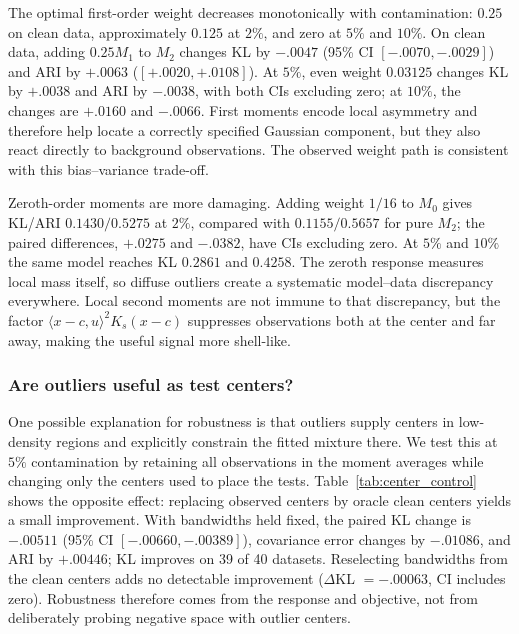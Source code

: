 \documentclass[11pt,a4paper]{article}
\newcommand{\Mzero}{M_0}
\newcommand{\Mone}{M_1}
\newcommand{\Mtwo}{M_2}
\begin{document}
The optimal first-order weight decreases monotonically with contamination:
$0.25$ on clean data, approximately $0.125$ at $2\%$, and zero at $5\%$ and
$10\%$.  On clean data, adding $0.25\Mone$ to $\Mtwo$ changes KL by
$-.0047$ (95\% CI $[-.0070,-.0029]$) and ARI by $+.0063$
($[+.0020,+.0108]$).  At $5\%$, even weight $0.03125$ changes KL by $+.0038$
and ARI by $-.0038$, with both CIs excluding zero; at $10\%$, the changes are
$+.0160$ and $-.0066$.  First moments encode local asymmetry and therefore
help locate a correctly specified Gaussian component, but they also react
directly to background observations.  The observed weight path is consistent
with this bias--variance trade-off.

Zeroth-order moments are more damaging.  Adding weight $1/16$ to $\Mzero$
gives KL/ARI $0.1430/0.5275$ at $2\%$, compared with $0.1155/0.5657$ for pure
$\Mtwo$; the paired differences, $+.0275$ and $-.0382$, have CIs excluding
zero.  At $5\%$ and $10\%$ the same model reaches KL $0.2861$ and $0.4258$.
The zeroth response measures local mass itself, so diffuse outliers create a
systematic model--data discrepancy everywhere.  Local second moments are not
immune to that discrepancy, but the factor $\langle x-c,u\rangle^2K_s(x-c)$
suppresses observations both at the center and far away, making the useful
signal more shell-like.

\subsubsection{Are outliers useful as test centers?}

One possible explanation for robustness is that outliers supply centers in
low-density regions and explicitly constrain the fitted mixture there.  We
test this at $5\%$ contamination by retaining all observations in the moment
averages while changing only the centers used to place the tests.
Table~\ref{tab:center_control} shows the opposite effect: replacing observed
centers by oracle clean centers yields a small improvement.  With bandwidths
held fixed, the paired KL change is $-.00511$ (95\% CI
$[-.00660,-.00389]$), covariance error changes by $-.01086$, and ARI by
$+.00446$; KL improves on 39 of 40 datasets.  Reselecting bandwidths from the
clean centers adds no detectable improvement ($\Delta$KL $=-.00063$, CI
includes zero).  Robustness therefore comes from the response and objective,
not from deliberately probing negative space with outlier centers.
\end{document}
